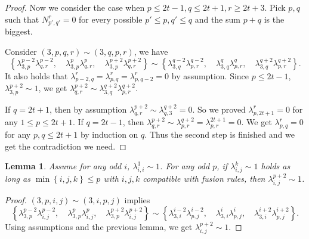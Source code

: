 \documentclass{article}
\newtheorem{lemma}{Lemma}[section]
\begin{document}
\begin{proof}

Now we consider the case when $p\leq 2t-1,q\leq 2t+1,r\geq 2t+3$.
Pick $p,q$ such that $N_{p',q'}^r=0$ for every possible $p'\leq p, q'\leq q$ and the sum $p+q$ is the biggest.

Consider $(3,p,q,r)\sim(3,q,p,r)$,
we have
$$\left\{
	\lambda_{3,p}^{p-2}\lambda_{q,r}^{p-2},\quad
\lambda_{3,p}^{p}\lambda_{q,r}^{p},\quad
\lambda_{3,p}^{p+2}\lambda_{q,r}^{p+2}\right\}
\sim
\left\{
\lambda_{3,q}^{q-2}\lambda_{p,r}^{q-2},\quad
\lambda_{3,q}^{q}\lambda_{p,r}^{q},\quad
\lambda_{3,q}^{q+2}\lambda_{p,r}^{q+2}\right\}.$$
It also holds that $\lambda_{p-2,q}^{r}=\lambda_{p,q}^{r}=\lambda_{p,q-2}^{r}=0$ by assumption.
Since $p\leq 2t-1$, $\lambda_{3,p}^{p+2}\sim 1$,
we get $\lambda_{q,r}^{p+2}\sim\lambda_{3,q}^{q+2}\lambda_{p,r}^{q+2}$.

If $q=2t+1$, then by assumption $\lambda_{q,r}^{p+2}\sim\lambda_{q,3}^{q+2}=0$.
So we proved $\lambda_{p,2t+1}^r=0$ for any $1\leq p\leq 2t+1$.
If $q=2t-1$, then $\lambda_{q,r}^{p+2}\sim\lambda_{p,r}^{q+2}=\lambda_{p,r}^{2t+1}=0$.
We get $\lambda_{p,q}^r=0$ for any $p,q\leq 2t+1$ by induction on $q$.
Thus the second step is finished and we get the contradiction we need.
\end{proof}

\begin{lemma}{\label{recursion}}
Assume for any odd $i$, $\lambda_{i,i}^3\sim 1$.
For any odd $p$, if $\lambda_{i,j}^k\sim 1$ holds as long as
$\min\left\{i,j,k\right\}\leq p$
with $i,j,k$ compatible with fusion rules,
then $\lambda_{i,j}^{p+2}\sim 1$.
\end{lemma}

\begin{proof}
$(3,p,i,j)\sim(3,i,p,j)$ implies
$$
\left\{\lambda_{3,p}^{p-2}\lambda_{i,j}^{p-2},\quad
\lambda_{3,p}^{p}\lambda_{i,j}^{p},\quad
\lambda_{3,p}^{p+2}\lambda_{i,j}^{p+2}\right\}
\sim
\left\{
\lambda_{3,i}^{i-2}\lambda_{p,j}^{i-2},\quad
\lambda_{3,i}^{i}\lambda_{p,j}^{i},\quad
\lambda_{3,i}^{i+2}\lambda_{p,j}^{i+2}\right\}.
$$
Using assumptions and the previous lemma, we get $\lambda_{i,j}^{p+2}\sim 1$.
\end{proof}
\end{document}
